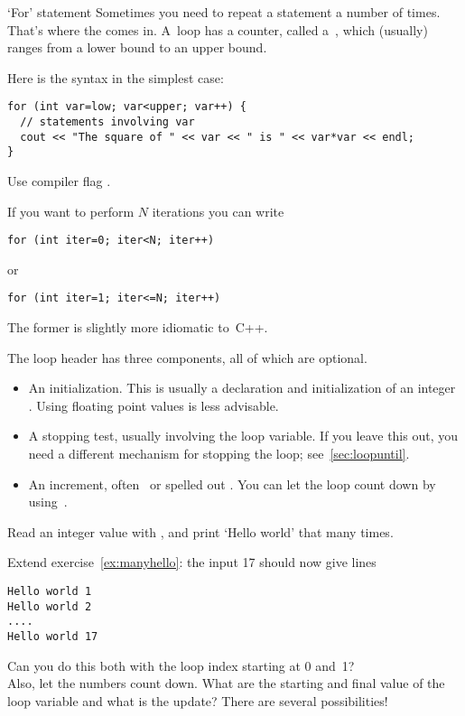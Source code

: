 \begin{slide}{`For' statement}
  \label{sl:for}
  Sometimes you need to repeat a statement a number of times. That's
  where the  comes in. A~loop has a counter, called
  a~, which (usually) ranges from a lower bound
  to an upper bound.

  Here is the syntax in the simplest case:
\begin{lstlisting}
for (int var=low; var<upper; var++) {
  // statements involving var
  cout << "The square of " << var << " is " << var*var << endl;
}
\end{lstlisting}
\begin{cnote}
Use compiler flag .
\end{cnote}
\end{slide}

If you want to perform $N$ iterations you can write
\begin{lstlisting}
for (int iter=0; iter<N; iter++)
\end{lstlisting}
or
\begin{lstlisting}
for (int iter=1; iter<=N; iter++)
\end{lstlisting}
The former is slightly more idiomatic to~C++.

The loop header has three components, all of which are optional.
\begin{itemize}
\item An initialization. This is usually a declaration and
  initialization of an integer . Using
  floating point values is less advisable.
\item A stopping test, usually
  involving the loop variable. If you leave this out, you need a
  different mechanism for stopping the loop; see~\ref{sec:loopuntil}.
\item An increment, often~ or spelled out . You can let the loop count down by using~.
\end{itemize}

\begin{exercise}
  \label{ex:manyhello}
  Read an integer value with , and print `Hello world' that many times.
\end{exercise}
\begin{exercise}
  \label{ex:counthello}
  Extend exercise~\ref{ex:manyhello}: the input 17 should now give lines
\begin{verbatim}
Hello world 1
Hello world 2
....
Hello world 17
\end{verbatim}
Can you do this both with the loop index starting at 0 and~1?\\
Also, let the numbers count down. What are the starting and final
value of the loop variable and what is the update? There are several possibilities!
\end{exercise}


